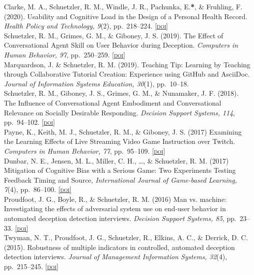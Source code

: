 \documentclass[10pt, letter]{article}
\newcommand{\doi}[1]{\href{#1}{\scriptsize\textsc{[doi]}}}
\newcommand{\years}[1]{\marginnote{\scriptsize #1}}
\begin{document}
\years{} Clarke, M. A., Schuetzler, R. M., Windle, J. R., Pachunka, E.\textbf{*}, \& Fruhling, F. (2020). 
Usability and Cognitive Load in the Design of a Personal Health Record. 
\emph{Health Policy and Technology, 9}(2), pp.\ 218--224. \doi{https://doi.org/10.1016/j.hlpt.2019.10.002}\\

\years{2019} Schuetzler, R. M., Grimes, G. M., \& Giboney, J. S. (2019). 
The Effect of Conversational Agent Skill on User Behavior during Deception. 
\emph{Computers in Human Behavior, 97}, pp.\ 250--259. \doi{https://doi.org/10.1016/j.chb.2019.03.033}\\

\years{}Marquardson, J. \& Schuetzler, R. M. (2019). Teaching Tip: Learning by Teaching through Collaborative Tutorial Creation: Experience using GitHub and AsciiDoc. \emph{Journal of Information Systems Education, 30}(1), pp.\ 10--18.\\

\years{2018}Schuetzler, R. M., Giboney, J. S., Grimes, G. M., \& Nunamaker, J. F. (2018).
The Influence of Conversational Agent Embodiment and Conversational Relevance on Socially Desirable Responding.
\emph{Decision Support Systems, 114}, pp.\ 94--102. \doi{https://doi.org/10.1016/j.dss.2018.08.011}\\

\years{2017} Payne, K., Keith, M. J., Schuetzler, R. M., \& Giboney, J. S. (2017)
Examining the Learning Effects of Live Streaming Video Game Instruction over
Twitch. \emph{Computers in Human Behavior, 77}, pp.\ 95--109. \doi{https://doi.org/10.1016/j.chb.2017.08.029}\\

\years{} Dunbar, N. E., Jensen, M. L., Miller, C. H., \ldots{}, \& Schuetzler,
R. M. (2017) Mitigation of Cognitive Bias with a Serious Game: Two Experiments
Testing Feedback Timing and Source, \emph{International Journal of Game-based
	Learning, 7}(4), pp.\ 86--100. \doi{https://doi.org/10.4018/IJGBL.2017100105}\\

\years{2016} Proudfoot, J. G., Boyle, R., \& Schuetzler, R. M. (2016) Man
vs. machine: Investigating the effects of adversarial system use on end-user
behavior in automated deception detection interviews. \emph{Decision Support
	Systems, 85}, pp.\ 23--33. \doi{https://doi.org/10.1016/j.dss.2016.02.008}\\

\years{2015} Twyman, N. T., Proudfoot, J. G., Schuetzler, R., Elkins,
A. C., \& Derrick, D. C. (2015). Robustness of multiple indicators in
controlled, automated deception detection interviews. \emph{Journal of
	Management Information Systems, 32}(4), pp.\ 215--245. \doi{https://doi.org/10.1080/07421222.2015.1138569}\\
\end{document}

